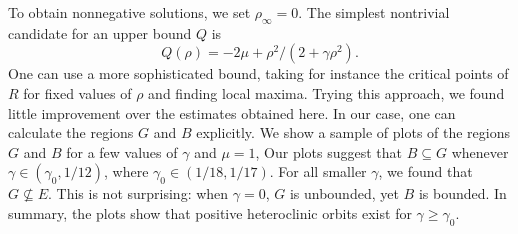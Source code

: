 \documentclass[10pt]{article}
\renewcommand{\geq}{\geqslant}
\begin{document}
To obtain  nonnegative solutions, we set $\rho_\infty = 0$.  The simplest nontrivial candidate for an upper bound $Q$ is 
\begin{equation}
Q(\rho) = -2\mu + \rho^2/(2+\gamma \rho^2).
\label{Q}
\end{equation}
One can use a more sophisticated bound, taking for instance the critical points of $R$ for fixed values of $\rho$ and finding local maxima. Trying this approach, we found little improvement over the estimates obtained here. In our case, one can calculate the regions $G$ and $B$ explicitly.
We show a sample of plots of the regions $G$ and $B$ for a few values of $\gamma$ and $\mu = 1$, Our plots suggest that $B\subseteq G$ whenever $\gamma \in (\gamma_0,1/12)$, where $\gamma_0 \in (1/18, 1/17)$.  For all smaller $\gamma$, we found that $G \not \subseteq E$.  This is not surprising: when $\gamma = 0$, $G$ is unbounded, yet $B$ is bounded. In summary, the plots show that positive heteroclinic orbits exist for $\gamma\geq \gamma_0$. 
\end{document}
